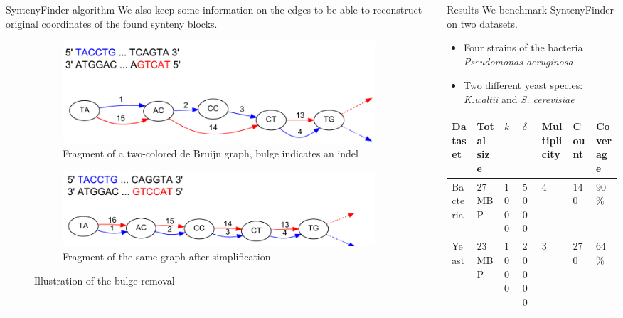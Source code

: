 \documentclass[final,hyperref={pdfpagelabels=false}]{beamer}
\begin{document}
\begin{frame}{}
\begin{columns}[t]
\begin{column}{0.32\linewidth}
\begin{block}{SyntenyFinder algorithm}
We also keep some information on the edges to be able to reconstruct original coordinates of the found synteny blocks.

\begin{figure}
        \begin{subfigure}[a]{1\textwidth}
		\centering
		\includegraphics[scale = 1.30]{graph1.pdf}
		\justifying
		\small \caption{Fragment of a two-colored de Bruijn graph, bulge indicates an indel}
		\label{DeBruijnA}
        \end{subfigure}
        \begin{subfigure}[b]{1\textwidth}
		\centering
		\includegraphics[scale = 1.30]{graph2.pdf}
		\small \caption{Fragment of the same graph after simplification}
		\label{DeBruijnB}
        \end{subfigure}
	\small \caption{Illustration of the bulge removal}
\end{figure}

\end{block}

\end{column}

\begin{column}{0.32\linewidth}

\begin{block}{Results} \justifying
We benchmark SyntenyFinder on two datasets.
\begin{itemize}
\item Four strains of the bacteria \textit{Pseudomonas aeruginosa}
\item Two different yeast species: \textit{K.waltii} and \textit{S. cerevisiae}
\end{itemize}

\begin{table}
\small
\begin{tabularx}{\textwidth}{ | X | X | X | X | X | X | X |}
	\hline
	Dataset & Total size & \(k\) & \(\delta\) & Multiplicity & Count & Coverage\\
	\hline \hline
	Bacteria & 27 MBP & 1000 & 5000 & 4 & 140 & 90\% \\
	\hline
	Yeast    &  23 MBP & 1000 & 20000 & 3 &  270 & 64\% \\
	\hline
\end{tabularx}
\end{table}


\end{block}
\end{column}
\end{columns}
\end{frame}
\end{document}
